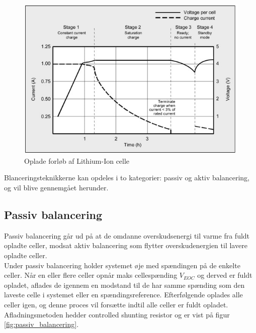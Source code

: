 \begin{figure}[h]
	\centering
	\includegraphics[width=15cm]{billeder/liion_opladning.png}
	\caption{Oplade forløb af Lithium-Ion celle}
	\label{fig:opladning_liion}
\end{figure}
\FloatBlock

Blanceringsteknikkerne kan opdeles i to kategorier: passiv og aktiv balancering, og vil blive gennemgået herunder.






\subsection{Passiv balancering}
Passiv balancering går ud på at de omdanne overskudsenergi til varme fra fuldt opladte celler, modsat aktiv balancering som flytter overskudenergien til lavere opladte celler.
\\

Under passiv balancering holder systemet øje med spændingen på de enkelte celler. Når en eller flere celler opnår maks cellespænding $V_{EOC}$ og derved er fuldt opladet, aflades de igennem en modstand til de har samme spænding som den laveste celle i systemet eller en spændingsreference. Efterfølgende oplades alle celler igen, og denne proces vil forsætte indtil alle celler er fuldt opladet. Afladningsmetoden hedder controlled shunting resistor og er vist på figur \ref{fig:passiv_balancering}. 



